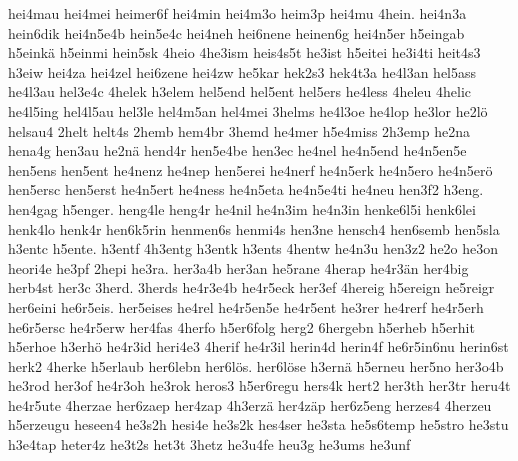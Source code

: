 {    hei4mau
    hei4mei
    heimer6f
    hei4min
    hei4m3o
    heim3p
    hei4mu
    4hein.
    hei4n3a
    hein6dik
    hei4n5e4b
    hein5e4c
    hei4neh
    hei6nene
    heinen6g
    hei4n5er
    h5eingab
    h5einkä
    h5einmi
    hein5sk
    4heio
    4he3ism
    heis4s5t
    he3ist
    h5eitei
    he3i4ti
    heit4s3
    h3eiw
    hei4za
    hei4zel
    hei6zene
    hei4zw
    he5kar
    hek2s3
    hek4t3a
    he4l3an
    hel5ass
    he4l3au
    hel3e4c
    4helek
    h3elem
    hel5end
    hel5ent
    hel5ers
    he4less
    4heleu
    4helic
    he4l5ing
    hel4l5au
    hel3le
    hel4m5an
    hel4mei
    3helms
    he4l3oe
    he4lop
    he3lor
    he2lö
    helsau4
    2helt
    helt4s
    2hemb
    hem4br
    3hemd
    he4mer
    h5e4miss
    2h3emp
    he2na
    hena4g
    hen3au
    he2nä
    hend4r
    hen5e4be
    hen3ec
    he4nel
    he4n5end
    he4n5en5e
    hen5ens
    hen5ent
    he4nenz
    he4nep
    hen5erei
    he4nerf
    he4n5erk
    he4n5ero
    he4n5erö
    hen5ersc
    hen5erst
    he4n5ert
    he4ness
    he4n5eta
    he4n5e4ti
    he4neu
    hen3f2
    h3eng.
    hen4gag
    h5enger.
    heng4le
    heng4r
    he4nil
    he4n3im
    he4n3in
    henke6l5i
    henk6lei
    henk4lo
    henk4r
    hen6k5rin
    henmen6s
    henmi4s
    hen3ne
    hensch4
    hen6semb
    hen5sla
    h3entc
    h5ente.
    h3entf
    4h3entg
    h3entk
    h3ents
    4hentw
    he4n3u
    hen3z2
    he2o
    he3on
    heori4e
    he3pf
    2hepi
    he3ra.
    her3a4b
    her3an
    he5rane
    4herap
    he4r3än
    her4big
    herb4st
    her3c
    3herd.
    3herds
    he4r3e4b
    he4r5eck
    her3ef
    4hereig
    h5ereign
    he5reigr
    her6eini
    he6r5eis.
    her5eises
    he4rel
    he4r5en5e
    he4r5ent
    he3rer
    he4rerf
    he4r5erh
    he6r5ersc
    he4r5erw
    her4fas
    4herfo
    h5er6folg
    herg2
    6hergebn
    h5erheb
    h5erhit
    h5erhoe
    h3erhö
    he4r3id
    heri4e3
    4herif
    he4r3il
    herin4d
    herin4f
    he6r5in6nu
    herin6st
    herk2
    4herke
    h5erlaub
    her6lebn
    her6lös.
    her6löse
    h3ernä
    h5erneu
    her5no
    her3o4b
    he3rod
    her3of
    he4r3oh
    he3rok
    heros3
    h5er6regu
    hers4k
    hert2
    her3th
    her3tr
    heru4t
    he4r5ute
    4herzae
    her6zaep
    her4zap
    4h3erzä
    her4zäp
    her6z5eng
    herzes4
    4herzeu
    h5erzeugu
    heseen4
    he3s2h
    hesi4e
    he3s2k
    hes4ser
    he3sta
    he5s6temp
    he5stro
    he3stu
    h3e4tap
    heter4z
    he3t2s
    het3t
    3hetz
    he3u4fe
    heu3g
    he3ums
    he3unf
}
